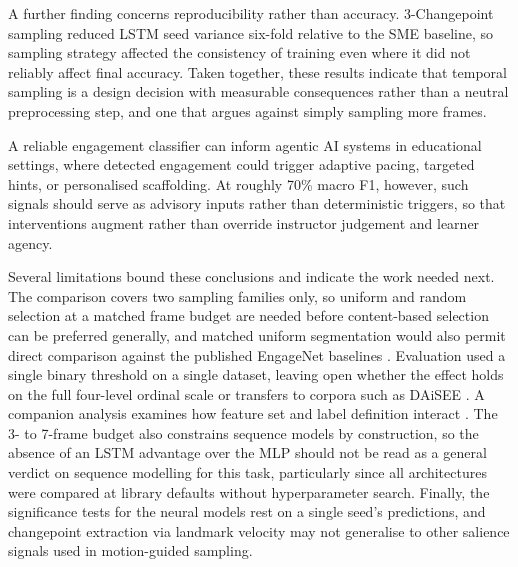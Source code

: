 \documentclass[11pt,a4paper]{article}
\begin{document}
A further finding concerns reproducibility rather than accuracy. 3-Changepoint sampling reduced LSTM seed variance six-fold relative to the SME baseline, so sampling strategy affected the consistency of training even where it did not reliably affect final accuracy. Taken together, these results indicate that temporal sampling is a design decision with measurable consequences rather than a neutral preprocessing step, and one that argues against simply sampling more frames.

A reliable engagement classifier can inform agentic AI systems in educational settings, where detected engagement could trigger adaptive pacing, targeted hints, or personalised scaffolding. At roughly 70\% macro F1, however, such signals should serve as advisory inputs rather than deterministic triggers, so that interventions augment rather than override instructor judgement and learner agency.

Several limitations bound these conclusions and indicate the work needed next. The comparison covers two sampling families only, so uniform and random selection at a matched frame budget are needed before content-based selection can be preferred generally, and matched uniform segmentation would also permit direct comparison against the published EngageNet baselines \citep{singh2023}. Evaluation used a single binary threshold on a single dataset, leaving open whether the effect holds on the full four-level ordinal scale or transfers to corpora such as DAiSEE \citep{gupta2016}. A companion analysis examines how feature set and label definition interact \citep{sityar2026}. The 3- to 7-frame budget also constrains sequence models by construction, so the absence of an LSTM advantage over the MLP should not be read as a general verdict on sequence modelling for this task, particularly since all architectures were compared at library defaults without hyperparameter search. Finally, the significance tests for the neural models rest on a single seed's predictions, and changepoint extraction via landmark velocity may not generalise to other salience signals used in motion-guided sampling.

\begingroup
\fontsize{10}{12}\selectfont

\endgroup
\end{document}
